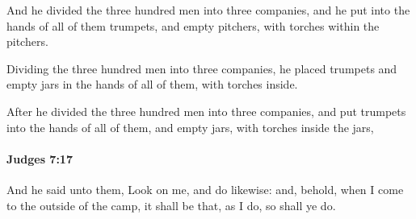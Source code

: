 			\begin{versebox}
					\item[BHS] 
					\item[ASV] And he divided the three hundred men into three companies, and he put into the hands of all of them trumpets, and empty pitchers, with torches within the pitchers.
					\item[NIV] Dividing the three hundred men into three companies, he placed trumpets and empty jars in the hands of all of them, with torches inside.
					\item[NRSV] After he divided the three hundred men into three companies, and put trumpets into the hands of all of them, and empty jars, with torches inside the jars,
			\end{versebox}

		\paragraph{Judges 7:17} %
			\label{JUDGES-7-17}

			And he said unto them, Look on me, and do likewise: and, behold, when I come to the outside of the camp, it shall be that, as I do, so shall ye do.

